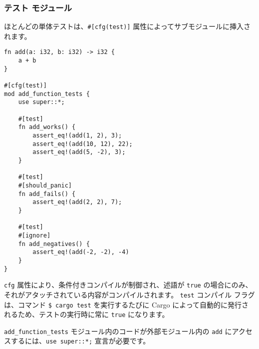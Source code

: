 \subsubsection{テスト モジュール}

ほとんどの単体テストは、\texttt{\#[cfg(test)]} 属性によってサブモジュールに挿入されます。

\begin{lstlisting}[numbers=none]
fn add(a: i32, b: i32) -> i32 {
    a + b
}

#[cfg(test)]
mod add_function_tests {
    use super::*;

    #[test]
    fn add_works() {
        assert_eq!(add(1, 2), 3);
        assert_eq!(add(10, 12), 22);
        assert_eq!(add(5, -2), 3);
    }

    #[test]
    #[should_panic]
    fn add_fails() {
        assert_eq!(add(2, 2), 7);
    }

    #[test]
    #[ignore]
    fn add_negatives() {
        assert_eq!(add(-2, -2), -4)
    }
}
\end{lstlisting}

\texttt{cfg} 属性により、条件付きコンパイルが制御され、述語が \texttt{true} の場合にのみ、それがアタッチされている内容がコンパイルされます。 \texttt{test} コンパイル フラグは、コマンド \texttt{\$ cargo test} を実行するたびに Cargo によって自動的に発行されるため、テストの実行時に常に \texttt{true} になります。

\texttt{add\_function\_tests} モジュール内のコードが外部モジュール内の \texttt{add} にアクセスするには、\texttt{use super::*;} 宣言が必要です。